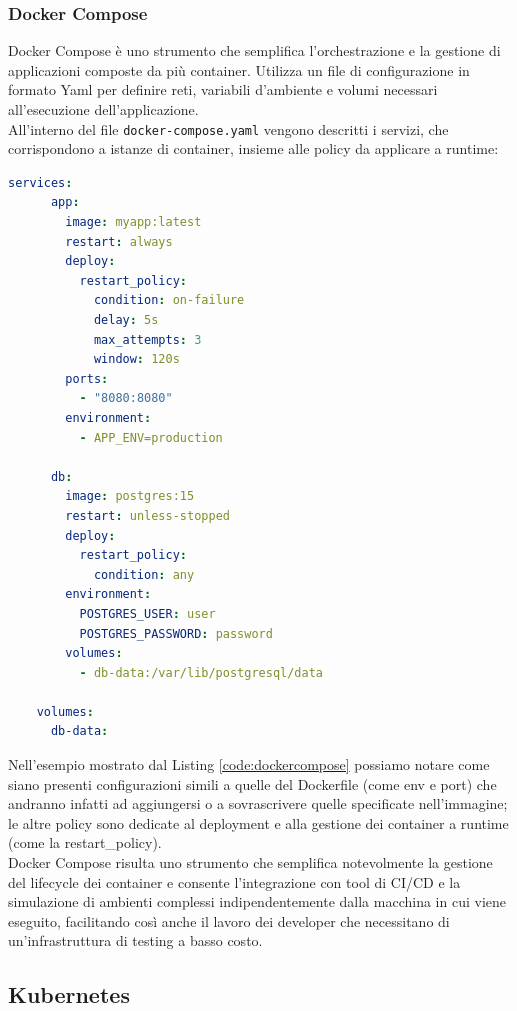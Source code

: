 \subsubsection{Docker Compose}

Docker Compose è uno strumento che semplifica l’orchestrazione e la gestione di applicazioni composte da più container. Utilizza un file di configurazione in formato Yaml per definire  reti, variabili d'ambiente e volumi necessari all'esecuzione dell'applicazione.\\
All'interno del file \texttt{docker-compose.yaml} vengono descritti i servizi, che corrispondono a istanze di container, insieme alle policy da applicare a runtime:

\begin{lstlisting}[language=yaml, caption={Esempio docker-compose}, captionpos=b, label={code:dockercompose}]
    services:
      app:
        image: myapp:latest
        restart: always
        deploy:
          restart_policy:
            condition: on-failure
            delay: 5s
            max_attempts: 3
            window: 120s
        ports:
          - "8080:8080"
        environment:
          - APP_ENV=production
    
      db:
        image: postgres:15
        restart: unless-stopped
        deploy:
          restart_policy:
            condition: any
        environment:
          POSTGRES_USER: user
          POSTGRES_PASSWORD: password
        volumes:
          - db-data:/var/lib/postgresql/data
    
    volumes:
      db-data:
\end{lstlisting}

Nell'esempio mostrato dal Listing \ref{code:dockercompose} possiamo notare come siano presenti configurazioni simili a quelle del Dockerfile (come env e port) che andranno infatti ad aggiungersi o a sovrascrivere quelle specificate nell'immagine; le altre policy sono dedicate al deployment e alla gestione dei container a runtime (come la restart\_policy).\\
Docker Compose risulta uno strumento che semplifica notevolmente la gestione del lifecycle dei container e consente l'integrazione con tool di CI/CD e la simulazione di ambienti complessi indipendentemente dalla macchina in cui viene eseguito, facilitando così anche il lavoro dei developer che necessitano di  un'infrastruttura di testing a basso costo.

\subsection{Kubernetes}

